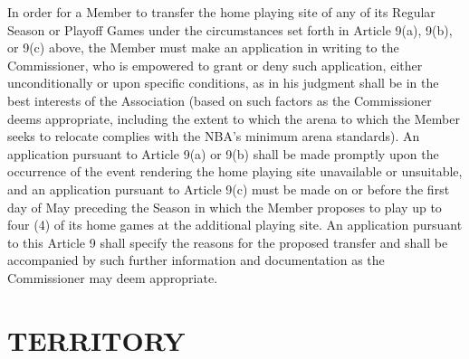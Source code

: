 \documentclass[]{book}
\theoremstyle{definition}
\theoremstyle{definition}
\theoremstyle{definition}
\theoremstyle{remark}
\begin{document}
In order for a Member to transfer the home playing site of any of its
Regular Season or Playoff Games under the circumstances set forth in
Article 9(a), 9(b), or 9(c) above, the Member must make an application
in writing to the Commissioner, who is empowered to grant or deny such
application, either unconditionally or upon specific conditions, as in
his judgment shall be in the best interests of the Association (based on
such factors as the Commissioner deems appropriate, including the extent
to which the arena to which the Member seeks to relocate complies with
the NBA's minimum arena standards). An application pursuant to Article
9(a) or 9(b) shall be made promptly upon the occurrence of the event
rendering the home playing site unavailable or unsuitable, and an
application pursuant to Article 9(c) must be made on or before the first
day of May preceding the Season in which the Member proposes to play up
to four (4) of its home games at the additional playing site. An
application pursuant to this Article 9 shall specify the reasons for the
proposed transfer and shall be accompanied by such further information
and documentation as the Commissioner may deem appropriate.

\section{TERRITORY}\label{territory}
\end{document}
